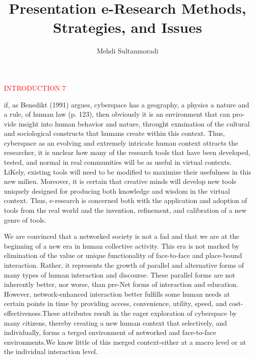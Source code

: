 \documentclass [8pt]{beamer}
\author{Mehdi Sultanmoradi}
\title{Presentation e-Research Methods, Strategies, and Issues}
\institute{PNU teh-shomal}
\begin{document}
\frame{\maketitle}
\begin{frame}	
	
	\begin{flushleft}
    \textcolor{red}{INTRODUCTION  7}		 
	\end{flushleft}
		
	if, as Benedikt (1991) argues, cyberspace has a geography, a physics a nature and a rule, of human law (p. 123), then obviously it is an environment that can pro-vide insight into human behavior and nature, throught exmination of the cultural and sociological constructs that humans create within this context. Thus, cyberspace as an evolving and extremely intricate human context attracts the researcher, it is unclear how many of the research tools that have been developed, tested, and normal in real communities will be as useful in virtual contexts. LiKely, existing tools will need to be modified to maximize their usefulness in this new milieu. Moreover, it is certain that creative minds will develop new tools uniquely designed for producing both knowledge and wisdom in the virtual context. Thus, e-research is concerned both with the application and adoption of tools from the real world and the invention, refinement, and calibration of a new genre of tools.
	
	We are convinced that a networked society is not a fad and that we are at the beginning of a new era in human collective activity. This era is not marked by elimination of the value or unique functionality of face-to-face and place-bound interaction. Rather, it represents the growth of parallel and alternative forms of many types of human interaction and discourse. These parallel forms are not inherently better, nor worse, than pre-Net forms of interaction and education. However, network-enhanced interaction better fulfills some human needs at certain points in time by providing access, convenience, utility, speed, and cost-effectiveness.These attributes result in the eager exploration of cyberspace by many citizens, thereby creating a new human context that selectively, and individually, forms a terged environment of networked and face-to-face environments.We know little of this merged context-either at a macro level or at the individual interaction level. 
	
\end{frame}	
\end{document}
